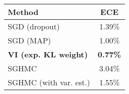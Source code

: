 \begin{tabular}{lc}
\toprule
                      Method &             ECE \\
\midrule
               SGD (dropout) &          1.39\% \\
                   SGD (MAP) &          1.00\% \\
\textbf{VI (exp. KL weight)} & \textbf{0.77\%} \\
                       SGHMC &          3.04\% \\
      SGHMC (with var. est.) &          1.55\% \\
\bottomrule
\end{tabular}
